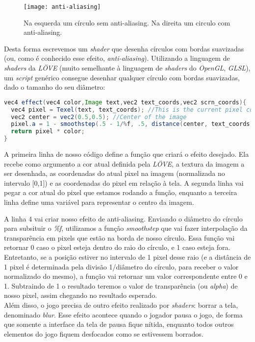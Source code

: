 \begin{figure}[h!]
\texttt{[image: anti-aliasing]}
\centering
\caption{Na esquerda um círculo sem anti-aliasing. Na direita um circulo com anti-aliasing.}
\end{figure}

Desta forma escrevemos um \textit{shader} que desenha círculos com bordas suavizadas (ou, como é conhecido esse efeito, \textit{anti-aliasing}). Utilizando a linguagem de \textit{shaders} da \textit{LÖVE} (muito semelhante à linguagem de \textit{shaders} do \textit{OpenGL}, \textit{GLSL}), um \textit{script} genérico consegue desenhar qualquer círculo com bordas suavizadas, dado o tamanho do seu diâmetro:

\begin{lstlisting}[language=java]
vec4 effect(vec4 color,Image text,vec2 text_coords,vec2 scrn_coords){
  vec4 pixel = Texel(text, text_coords); //This is the current pixel color
  vec2 center = vec2(0.5,0.5); //Center of the image
  pixel.a = 1 - smoothstep(.5 - 1/%f, .5, distance(center, text_coords));
  return pixel * color;
}
\end{lstlisting}

A primeira linha de nosso código define a função que criará o efeito desejado. Ela recebe como argumento a cor atual definida pela \textit{LÖVE}, a textura da imagem a ser desenhada, as coordenadas do atual pixel na imagem (normalizada no intervalo [0,1]) e as coordenadas do pixel em relação à tela. A segunda linha vai pegar a cor atual do pixel que estamos rodando a função,
enquanto a terceira linha define uma variável para representar o centro da imagem.

A linha 4 vai criar nosso efeito de anti-aliasing. Enviando o diâmetro do círculo para subsituir o \textit{\%f}, utilizamos a função \textit{smoothstep} que vai fazer interpolação da transparência em pixels que estão na borda de nosso círculo. Essa função vai retornar 0 caso o pixel esteja dentro do raio do círculo, e 1 caso esteja fora. Entretanto, se a posição estiver no intervalo de 1 pixel desse raio (e a distância de 1 pixel é determinada pela divisão 1/diâmetro do círculo, para receber o valor normalizado do mesmo), a função vai retornar um valor correspondente entre 0 e 1. Subtraindo de 1 o resultado teremos o valor de transparência (ou \textit{alpha}) de nosso pixel, assim chegando no resultado esperado.\\


Além disso, o jogo precisa de outro efeito realizado por \textit{shaders}: borrar a tela, denominado \textit{blur}. Esse efeito acontece quando o jogador pausa o jogo, de forma que somente a interface da tela de pausa fique nítida, enquanto todos outros elementos do jogo fiquem desfocados como se estivessem borrados.

